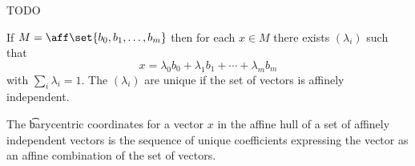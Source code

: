 
TODO


\begin{prop}
  If $M = \aff\set{b_0, b_1, \dots, b_m}$ then for each $x \in M$ there exists $(\lambda_i)$ such that
  $$
    x = \lambda_0 b_0 + \lambda_1 b_1 + \cdots + \lambda_m b_m
  $$
  with $\sum_{i} \lambda_i = 1$.
  The $(\lambda_i)$ are unique if the set of vectors is affinely independent.
\end{prop}

The \t{barycentric coordinates} for a vector $x$ in the affine hull of a set of affinely independent vectors is the sequence of unique coefficients expressing the vector as an affine combination of the set of vectors.
